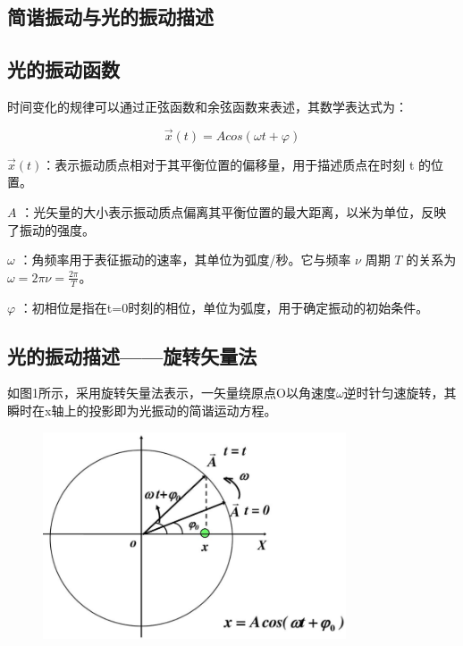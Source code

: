 \documentclass[withoutpreface,bwprint]{cumcmthesis} %
\begin{document}
\newpage
\begin{appendices}
    \section{简谐振动与光的振动描述}
    \label{app:optical_basis}

    \subsection{光的振动函数}
    时间变化的规律可以通过正弦函数和余弦函数来表述，其数学表达式为：

    \[\overrightarrow{x}(t) = Acos(\omega t + \varphi)\]

    \(\overrightarrow{x}(t)\)：表示振动质点相对于其平衡位置的偏移量，用于描述质点在时刻 t 的位置。

    \(A\) ：光矢量的大小表示振动质点偏离其平衡位置的最大距离，以米为单位，反映了振动的强度。

    \(\omega\) ：角频率用于表征振动的速率，其单位为弧度/秒。它与频率 \(\nu\) 周期 \(T\) 的关系为 \(\omega = 2\pi\nu = \frac{2\pi}{T}\)。

    \(\varphi\) ：初相位是指在t=0时刻的相位，单位为弧度，用于确定振动的初始条件。

    \subsection{光的振动描述——旋转矢量法}
    如图1所示，采用旋转矢量法表示，一矢量绕原点O以角速度$\omega$逆时针匀速旋转，其瞬时在x轴上的投影即为光振动的简谐运动方程。

    \begin{figure}[!h]
        \centering
        \includegraphics[width=0.8\textwidth]{figures/figure1.png} %


\end{figure}
\end{appendices}
\end{document}
